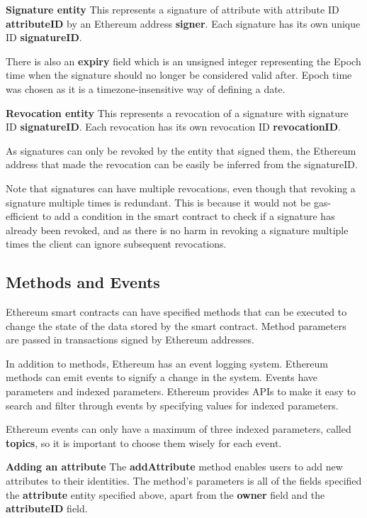 \documentclass[12pt]{report}
\begin{document}
	\bigskip
	\noindent \textbf{Signature entity}\newline
	This represents a signature of attribute with attribute ID \textbf{attributeID} by an Ethereum address \textbf{signer}. Each signature has its own unique ID \textbf{signatureID}.
	
	There is also an \textbf{expiry} field which is an unsigned integer representing the Epoch time when the signature should no longer be considered valid after. Epoch time was chosen as it is a timezone-insensitive way of defining a date.
	
	\bigskip
	\noindent \textbf{Revocation entity}\newline
	This represents a revocation of a signature with signature ID \textbf{signatureID}. Each revocation has its own revocation ID \textbf{revocationID}.
	
	As signatures can only be revoked by the entity that signed them, the Ethereum address that made the revocation can be easily be inferred from the signatureID.
	
	Note that signatures can have multiple revocations, even though that revoking a signature multiple times is redundant. This is because it would not be gas-efficient to add a condition in the smart contract to check if a signature has already been revoked, and as there is no harm in revoking a signature multiple times the client can ignore subsequent revocations.
	
	\subsection{Methods and Events}
	Ethereum smart contracts can have specified methods that can be executed to change the state of the data stored by the smart contract. Method parameters are passed in transactions signed by Ethereum addresses.
	
	In addition to methods, Ethereum has an event logging system. Ethereum methods can emit events to signify a change in the system. Events have parameters and indexed parameters. Ethereum provides APIs to make it easy to search and filter through events by specifying values for indexed parameters.
	
	Ethereum events can only have a maximum of three indexed parameters, called \textbf{topics}, so it is important to choose them wisely for each event.\cite{14}
	
	\bigskip
	\noindent \textbf{Adding an attribute}\newline
	The \textbf{addAttribute} method enables users to add new attributes to their identities. The method's parameters is all of the fields specified the \textbf{attribute} entity specified above, apart from the \textbf{owner} field and the \textbf{attributeID} field.
	
\end{document}
